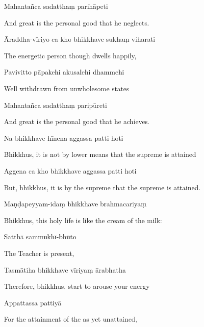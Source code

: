 Mahantañca sadatthaṃ parihāpeti

\begin{english}
  And great is the personal good that he neglects.
\end{english}

Āraddha-vīriyo ca kho bhikkhave sukhaṃ viharati

\begin{english}
  The energetic person though dwells happily,
\end{english}

Pavivitto pāpakehi akusalehi dhammehi

\begin{english}
  Well withdrawn from unwholesome states
\end{english}

Mahantañca sadatthaṃ paripūreti

\begin{english}
  And great is the personal good that he achieves.
\end{english}

Na bhikkhave hīnena aggassa patti hoti

\begin{english}
  Bhikkhus, it is not by lower means that the supreme is attained
\end{english}

Aggena ca kho bhikkhave aggassa patti hoti

\begin{english}
  But, bhikkhus, it is by the supreme that the supreme is attained.
\end{english}

Maṇḍapeyyam-idaṃ bhikkhave brahmacariyaṃ

\begin{english}
  Bhikkhus, this holy life is like the cream of the milk:
\end{english}

Satthā sammukhī-bhūto

\begin{english}
  The Teacher is present,
\end{english}

Tasmātiha bhikkhave vīriyaṃ ārabhatha

\begin{english}
  Therefore, bhikkhus, start to arouse your energy
\end{english}

Appattassa pattiyā

\begin{english}
  For the attainment of the as yet unattained,
\end{english}


